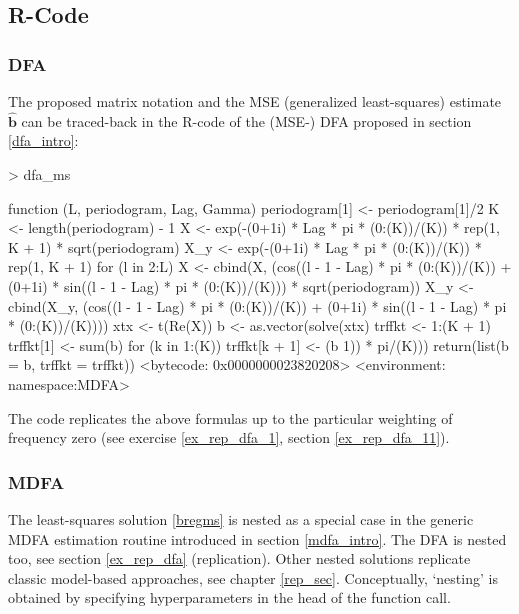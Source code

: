 \documentclass[a4paper]{book}
\begin{document}
\subsection{R-Code}

\subsubsection{DFA}

The proposed matrix notation and the MSE (generalized least-squares) estimate $\hat{\mathbf{b}}$ can be traced-back in the R-code of the (MSE-) DFA proposed in section \ref{dfa_intro}:

\begin{Schunk}
\begin{Sinput}
> dfa_ms
\end{Sinput}
\begin{Soutput}
function (L, periodogram, Lag, Gamma) 
{
    periodogram[1] <- periodogram[1]/2
    K <- length(periodogram) - 1
    X <- exp(-(0+1i) * Lag * pi * (0:(K))/(K)) * rep(1, K + 1) * 
        sqrt(periodogram)
    X_y <- exp(-(0+1i) * Lag * pi * (0:(K))/(K)) * rep(1, K + 
        1)
    for (l in 2:L) {
        X <- cbind(X, (cos((l - 1 - Lag) * pi * (0:(K))/(K)) + 
            (0+1i) * sin((l - 1 - Lag) * pi * (0:(K))/(K))) * 
            sqrt(periodogram))
        X_y <- cbind(X_y, (cos((l - 1 - Lag) * pi * (0:(K))/(K)) + 
            (0+1i) * sin((l - 1 - Lag) * pi * (0:(K))/(K))))
    }
    xtx <- t(Re(X)) %
    b <- as.vector(solve(xtx) %
    trffkt <- 1:(K + 1)
    trffkt[1] <- sum(b)
    for (k in 1:(K)) {
        trffkt[k + 1] <- (b %
            1)) * pi/(K)))
    }
    return(list(b = b, trffkt = trffkt))
}
<bytecode: 0x0000000023820208>
<environment: namespace:MDFA>
\end{Soutput}
\end{Schunk}
The code replicates the above formulas up to the particular weighting of frequency zero (see exercise \ref{ex_rep_dfa_1}, section \ref{ex_rep_dfa_11}).

\subsubsection{MDFA}

The least-squares solution \ref{bregms} is nested as a special case in the generic MDFA estimation routine introduced in section \ref{mdfa_intro}. The DFA is nested too, see section  \ref{ex_rep_dfa} (replication). Other nested solutions replicate classic model-based approaches, see chapter \ref{rep_sec}. Conceptually, `nesting' is obtained by specifying hyperparameters in the head of the function call.
\end{document}
